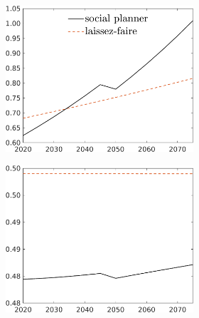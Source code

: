\begin{figure}[h!!]
\begin{subfigure}{1\textwidth}
\begin{subfigure}[]{0.32\textwidth}
		\end{subfigure}
	\end{subfigure}	
	\begin{subfigure}{1\textwidth}		
		\caption{Laissez-faire and social planner allocation}
		\begin{subfigure}[]{0.32\textwidth}
			\includegraphics[width=1\textwidth]{../../codding_model/own_basedOnFried/optimalPol_010922_revision/figures/all_13Sept22_Tplus30/C_LFCompSP_T_regime4_knspil1_spillover0_noskill0_sep0_xgrowth0_PV1_etaa0.79_lgd1.png}
		\end{subfigure}	
		\begin{subfigure}[]{0.32\textwidth}
			\includegraphics[width=1\textwidth]{../../codding_model/own_basedOnFried/optimalPol_010922_revision/figures/all_13Sept22_Tplus30/hh_LFCompSP_T_regime4_knspil1_spillover0_noskill0_sep0_xgrowth0_PV1_etaa0.79_lgd0.png}

\end{subfigure}
\end{subfigure}
\end{figure}
